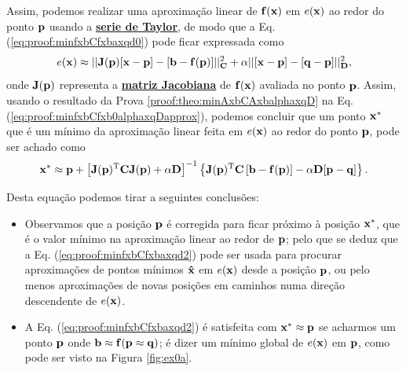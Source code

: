 \begin{myproofT}
Assim, podemos realizar uma aproximação linear de $\VECTOR{f}(\VECTOR{x})$ em $e(\VECTOR{x})$
ao redor do ponto $\VECTOR{p}$ usando a \hyperref[def:taylor]{\textbf{serie de Taylor}},
de modo que a Eq. (\ref{eq:proof:minfxbCfxbaxqd0}) pode ficar expressada como
\begin{equation}\label{eq:proof:minfxbCfxb0alphaxqDapprox}
e(\VECTOR{x}) \approx 
||\MATRIX{J}(\VECTOR{p})[\VECTOR{x}-\VECTOR{p}]-[\VECTOR{b}-\VECTOR{f}(\VECTOR{p})]||_{\MATRIX{C}}^2+
\alpha||[\VECTOR{x}-\VECTOR{p}]-[\VECTOR{q}-\VECTOR{p}]||_{\MATRIX{D}}^2,
\end{equation}
onde $\MATRIX{J}(\VECTOR{p})$ representa a \hyperref[def:jacobian]{\textbf{matriz Jacobiana}} 
de $\VECTOR{f}(\VECTOR{x})$ avaliada no ponto $\VECTOR{p}$.
Assim, usando o resultado da Prova \ref{proof:theo:minAxbCAxbalphaxqD} na Eq. (\ref{eq:proof:minfxbCfxb0alphaxqDapprox}), 
podemos concluir que um ponto $\VECTOR{x}^*$ que é 
um mínimo da aproximação linear feita em $e(\VECTOR{x})$ ao redor do ponto $\VECTOR{p}$,
pode ser achado como
\begin{equation}\label{eq:proof:minfxbCfxbaxqd2}
\VECTOR{x}^* \approx \VECTOR{p} +
\left[ \MATRIX{J}(\VECTOR{p})^{\transpose}\MATRIX{C} \MATRIX{J}(\VECTOR{p})+\alpha \MATRIX{D} \right]^{-1}
\left\{ \MATRIX{J}(\VECTOR{p})^{\transpose}\MATRIX{C} \left[\VECTOR{b}-\VECTOR{f}(\VECTOR{p})\right]-\alpha\MATRIX{D}[\VECTOR{p}-\VECTOR{q}]\right\}.
\end{equation}


Desta equação podemos tirar a seguintes conclusões:
\begin{itemize}

\item Observamos que a posição $\VECTOR{p}$ é corregida para ficar próximo à posição $\VECTOR{x}^*$, 
que é o valor mínimo na aproximação linear ao redor de $\VECTOR{p}$;
pelo que se deduz que a Eq. (\ref{eq:proof:minfxbCfxbaxqd2})
pode ser usada para procurar aproximações de pontos mínimos $\VECTOR{\hat{x}}$ em $e(\VECTOR{x})$ desde a posição $\VECTOR{p}$,
ou pelo menos aproximações de novas posições em caminhos numa direção descendente de $e(\VECTOR{x})$.

\item A Eq. (\ref{eq:proof:minfxbCfxbaxqd2}) é satisfeita 
com $\VECTOR{x}^* \approx \VECTOR{p}$ se acharmos um  
ponto $\VECTOR{p}$ onde  $\VECTOR{b} \approx \VECTOR{f}(\VECTOR{p}\approx \VECTOR{q})$; 
é dizer um mínimo global de $e(\VECTOR{x})$ em $\VECTOR{p}$, como pode ser visto na Figura \ref{fig:ex0a}. 


\end{itemize}
\end{myproofT}
